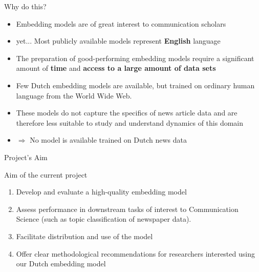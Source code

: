 \documentclass{beamer}
\begin{document}
\begin{frame}{Why do this?}
\begin{itemize}
\item Embedding models are of great interest to communication scholars
\item yet... Most publicly available models represent \textbf{English} language
\item The preparation of good-performing embedding models require a significant amount of \textbf{time} and \textbf{access to a large amount of data sets}
\item Few Dutch embedding models are available, but trained on ordinary human language from the World Wide Web.
\item These models do not capture the specifics of news article data and are therefore less suitable to study and understand dynamics of this domain
\item $\Rightarrow$ No model is available trained on Dutch news data
\end{itemize}
\end{frame}


\begin{frame}{Project's Aim}
\begin{block}{Aim of the current project} 
\begin{enumerate}
\item Develop and evaluate a high-quality embedding model
\item Assess performance in downstream tasks of interest to Communication Science (such as topic classification of newspaper data).
\item Facilitate distribution and use of the model
\item Offer clear methodological recommendations for researchers interested using our Dutch embedding model
\end{enumerate}
\end{block}
\end{frame}
\end{document}
